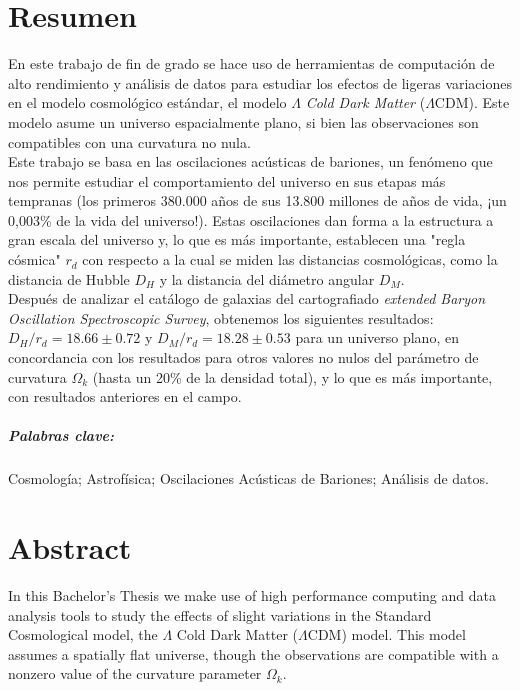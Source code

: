\chapter*{Resumen}

En este trabajo de fin de grado se hace uso de herramientas de computación de alto rendimiento y análisis de datos para estudiar los efectos de ligeras variaciones en el modelo cosmológico estándar, el modelo $\Lambda$ \textit{Cold Dark Matter} ($\Lambda$CDM). Este modelo asume un universo espacialmente plano, si bien las observaciones son compatibles con una curvatura no nula.\\

Este trabajo se basa en las oscilaciones acústicas de bariones, un fenómeno que nos permite estudiar el comportamiento del universo en sus etapas más tempranas (los primeros 380.000 años de sus 13.800 millones de años de vida, ¡un 0,003\% de la vida del universo!). Estas oscilaciones dan forma a la estructura a gran escala del universo y, lo que es más importante, establecen una "regla cósmica" $r_d$ con respecto a la cual se miden las distancias cosmológicas, como la distancia de Hubble $D_H$ y la distancia del diámetro angular $D_M$. \\

Después de analizar el catálogo de galaxias del cartografiado \textit{extended Baryon Oscillation Spectroscopic Survey}, obtenemos los siguientes resultados: $D_H/r_d = 18.66\pm 0.72$ y $D_M/r_d = 18.28\pm 0.53$ para un universo plano, en concordancia con los resultados para otros valores no nulos del parámetro de curvatura $\Omega_k$ (hasta un 20\% de la densidad total), y lo que es más importante, con resultados anteriores en el campo.

\paragraph{Palabras clave:} Cosmología; Astrofísica; Oscilaciones Acústicas de Bariones; Análisis de datos.









\chapter*{Abstract}

In this Bachelor's Thesis we make use of high performance computing and data analysis tools to study the effects of slight variations in the Standard Cosmological model, the $\Lambda$ Cold Dark Matter ($\Lambda$CDM) model. This model assumes a spatially flat universe, though the observations are compatible with a nonzero value of the curvature parameter $\Omega_k$.

